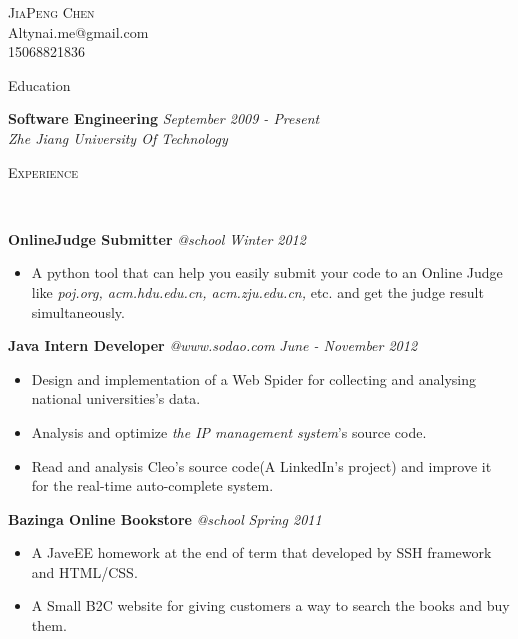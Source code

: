 ﻿\documentclass[9pt]{article}
\newenvironment{changemargin}[2]{%
  \begin{list}{}{%
    \setlength{\topsep}{0pt}%
    \setlength{\leftmargin}{#1}%
    \setlength{\rightmargin}{#2}%
    \setlength{\listparindent}{\parindent}%
    \setlength{\itemindent}{\parindent}%
    \setlength{\parsep}{\parskip}%
  }%
  \item[]}{\end{list}
}
\newcommand{\lineover}{
	\begin{changemargin}{-0.05in}{-0.05in}
		\vspace*{-8pt}
		\hrulefill \\
		\vspace*{-2pt}
	\end{changemargin}
}
\newcommand{\header}[1]{
	\begin{changemargin}{-0.5in}{-0.5in}
		\scshape{#1}\\
  	\lineover
	\end{changemargin}
}
\newcommand{\contact}[4]{
	\begin{changemargin}{-0.5in}{-0.5in}
		\begin{center}
			{\Large \scshape {#1}}\\ \smallskip
			{#2}\\ \smallskip
			{#3}\\ \smallskip
			{#4}\smallskip
		\end{center}
	\end{changemargin}
}
\newenvironment{body} {
	\vspace*{-16pt}
	\begin{changemargin}{-0.25in}{-0.5in}
  }	
	{\end{changemargin}
}
\begin{document}
\contact{JiaPeng Chen}{Altynai.me@gmail.com}{15068821836}

\header{Education}
\begin{body}
	\vspace{14pt}
	\textbf{Software Engineering} \hfill \emph{September 2009 - Present} \\
	\emph{Zhe Jiang University Of Technology}\\
\end{body}

\smallskip

\header{Experience}

\begin{body}
	\vspace{14pt}

    \textbf {OnlineJudge Submitter} \emph{@school} \hfill \emph{Winter 2012}\\
	\vspace*{-4pt}
	\begin{itemize} \itemsep -0pt
		\item A python tool that can help you easily submit your code to an Online Judge like \emph{poj.org, acm.hdu.edu.cn, acm.zju.edu.cn,} etc. and get the judge result simultaneously.
	\end{itemize}

	\textbf{Java Intern Developer} \emph{@www.sodao.com} \hfill \emph{June - November 2012}\\
	\vspace*{-4pt}
	\begin{itemize} \itemsep -0pt  %
		\item Design and implementation of a Web Spider for collecting and analysing national universities's data.
        \item Analysis and optimize \emph{the IP management system}'s source code.
        \item Read and analysis Cleo's source code(A LinkedIn's project) and improve it for the real-time auto-complete system.
	\end{itemize}

	\textbf {Bazinga Online Bookstore} \emph{@school} \hfill \emph{Spring 2011}\\
	\vspace*{-4pt}
	\begin{itemize} \itemsep -0pt
        \item A JaveEE homework at the end of term that developed by SSH framework and HTML/CSS.
		\item A Small B2C website for giving customers a way to search the books and buy them.
	\end{itemize}

\end{body}
\end{document}
